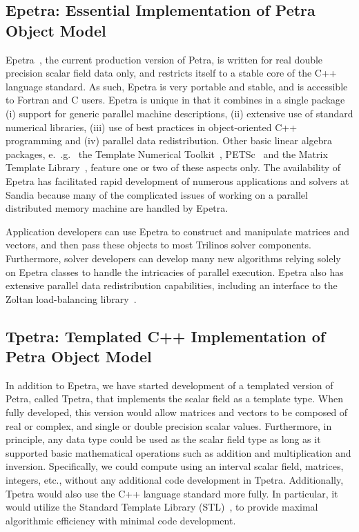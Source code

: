 \documentclass[12pt,strict]{SANDreport}
\begin{document}
\subsection{Epetra: Essential Implementation of Petra Object Model}

Epetra~\cite{Epetra-User-Guide}, the current production version of Petra,
 is written for real double precision scalar field data only, and
restricts itself to a stable core
of the C++ language standard.  As such, Epetra is very portable and stable, and  
is accessible to Fortran and C users.  
Epetra is unique in that it combines in a single package (i) support for generic parallel
machine descriptions, (ii) extensive use of standard numerical libraries, (iii) use of best
practices in object-oriented C++ programming and (iv) parallel data redistribution.
Other basic linear algebra packages, e.~.g.~ the Template Numerical Toolkit~\cite{TNT-site},
PETSc~\cite{petsc-manual} and the Matrix Template Library~\cite{SiekLums98}, feature one
or two of these aspects only.  The availability of Epetra has facilitated rapid development
of numerous applications and solvers at Sandia because many of the complicated issues of
working on a parallel distributed memory machine are handled by Epetra.

Application developers can use Epetra to construct and manipulate matrices
and vectors, and then pass these objects to most Trilinos solver components.  Furthermore,
solver developers can develop many new algorithms relying solely on Epetra classes to
handle the intricacies of parallel execution.  Epetra also has extensive parallel data  
redistribution capabilities, including an interface to the Zoltan load-balancing
library~\cite{zoltan-ug}.

\subsection{Tpetra: Templated C++ Implementation of Petra Object Model}

In addition to Epetra, we have started development of a templated version of Petra,
called Tpetra, that implements the scalar field as a template type.  When fully developed,
this version would allow
matrices and vectors to be composed of real or complex, and single or double precision scalar
values.  Furthermore, in principle, any data type could be used as the scalar field type as long
as it supported basic mathematical operations such as addition and multiplication and
inversion. Specifically, we could compute using an interval scalar field, matrices, integers,
etc., without any additional code development in Tpetra.  Additionally, Tpetra would also
use the C++ language standard more fully.  In particular, it would utilize the Standard
Template Library (STL)~\cite{Stroustrup}, to provide maximal
algorithmic efficiency with minimal code
development.
\end{document}
